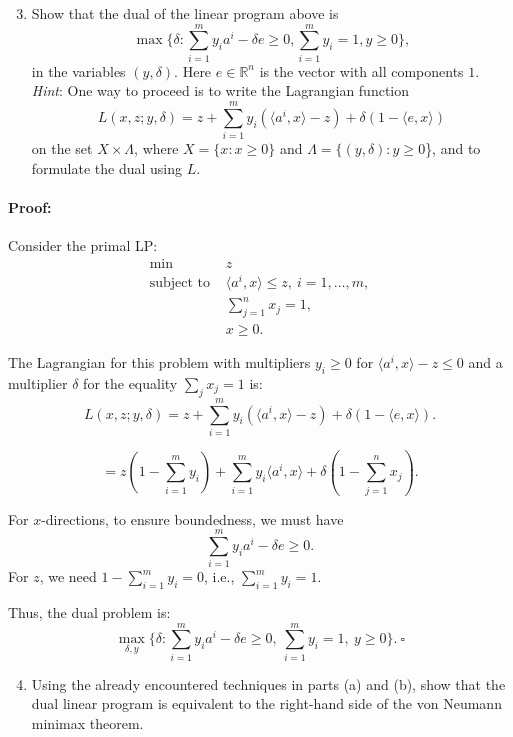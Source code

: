 \documentclass[10pt]{article}
\begin{document}
\begin{enumerate}[label=(\alph*)]
  \setcounter{enumi}{2}
  \item Show that the dual of the linear program above is 
  $$\max\{ \delta: \sum_{i=1}^{m} y_i a^i - \delta e \geq 0, \sum_{i=1}^{m} y_i = 1, y \geq 0\},$$
  in the variables $(y, \delta)$. Here $e \in \mathbb{R}^n$ is the vector with all components $1$. \textit{Hint}:
  One way to proceed is to write the Lagrangian function 
  $$L(x,z; y, \delta) = z + \sum_{i=1}^{m} y_i \left( \langle a^i, x \rangle - z \right) + \delta \left(1 - \langle e, x \rangle \right)$$
  on the set $X \times \Lambda$, where $X = \{x: x \geq 0\}$ and $\Lambda = \{(y, \delta): y \geq 0$\}, and to formulate the dual using $L$. 
\end{enumerate}

\paragraph{Proof:}


Consider the primal LP:
\[
\begin{aligned}
\min \quad & z \\
\text{subject to } & \langle a^i, x \rangle \le z, \ i=1,\ldots,m,\\
& \sum_{j=1}^n x_j = 1, \\
& x \geq 0.
\end{aligned}
\]

The Lagrangian for this problem with multipliers $y_i \geq 0$ for $\langle a^i, x \rangle - z \le 0$ and a multiplier $\delta$ for the equality $\sum_j x_j = 1$ is:
\[
L(x,z;y,\delta) = z + \sum_{i=1}^m y_i(\langle a^i, x \rangle - z) + \delta(1 - \langle e, x \rangle).
\]

\[
 = z(1 - \sum_{i=1}^m y_i) + \sum_{i=1}^m y_i \langle a^i, x \rangle + \delta(1 - \sum_{j=1}^n x_j).
\]

For $x$-directions, to ensure boundedness, we must have 
\[
\sum_{i=1}^m y_i a^i - \delta e \geq 0.
\]
For $z$, we need $1 - \sum_{i=1}^m y_i = 0$, i.e., $\sum_{i=1}^m y_i = 1$.

Thus, the dual problem is:
\[
\max_{\delta, y} \{\delta : \sum_{i=1}^m y_i a^i - \delta e \geq 0, \ \sum_{i=1}^m y_i = 1, \ y \geq 0 \}. \ \square
\]




\begin{enumerate}[label=(\alph*)]
  \setcounter{enumi}{3}
  \item Using the already encountered techniques in parts (a) and (b), show that the dual linear program is equivalent to the right-hand side of the von Neumann minimax theorem.
  
\end{enumerate}
\end{document}
